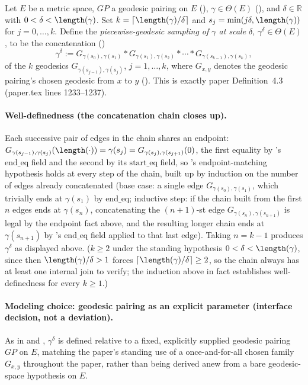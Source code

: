 \begin{definition}
  Let $E$ be a metric space, $GP$ a geodesic pairing on $E$ (),
  $\gamma \in \Theta(E)$ (), and $\delta \in \mathbb{R}$ with
  $0 < \delta < \length(\gamma)$. Set $k = \lceil \length(\gamma)/\delta \rceil$ and
  $s_j = \min(j\delta,\length(\gamma))$ for $j = 0,\dotsc,k$. Define the \emph{piecewise-geodesic
  sampling of $\gamma$ at scale $\delta$}, $\gamma^\delta \in \Theta(E)$, to be the concatenation
  ()
  \[
    \gamma^\delta := G_{\gamma(s_0),\gamma(s_1)} * G_{\gamma(s_1),\gamma(s_2)} * \cdots *
    G_{\gamma(s_{k-1}),\gamma(s_k)}
    ,
  \]
  of the $k$ geodesics $G_{\gamma(s_{j-1}),\gamma(s_j)}$, $j=1,\dotsc,k$, where $G_{x,y}$ denotes
  the geodesic pairing's chosen geodesic from $x$ to $y$ (). This is
  exactly paper Definition~4.3 (paper.tex lines 1233--1237).

  \paragraph{Well-definedness (the concatenation chain closes up).} Each successive pair of edges
  in the chain shares an endpoint: $G_{\gamma(s_{j-1}),\gamma(s_j)}(\length(\cdot)) = \gamma(s_j) =
  G_{\gamma(s_j),\gamma(s_{j+1})}(0)$, the first equality by 's
  $\mathrm{end\_eq}$ field and the second by its $\mathrm{start\_eq}$ field, so
  's endpoint-matching hypothesis holds at every step of the chain, built up
  by induction on the number of edges already concatenated (base case: a single edge
  $G_{\gamma(s_0),\gamma(s_1)}$, which trivially ends at $\gamma(s_1)$ by $\mathrm{end\_eq}$;
  inductive step: if the chain built from the first $n$ edges ends at $\gamma(s_n)$, concatenating
  the $(n{+}1)$-st edge $G_{\gamma(s_n),\gamma(s_{n+1})}$ is legal by the endpoint fact above, and
  the resulting longer chain ends at $\gamma(s_{n+1})$ by 's
  $\mathrm{end\_eq}$ field applied to that last edge). Taking $n = k-1$ produces $\gamma^\delta$ as
  displayed above. ($k \ge 2$ under the standing hypothesis $0 < \delta < \length(\gamma)$, since
  then $\length(\gamma)/\delta > 1$ forces $\lceil \length(\gamma)/\delta \rceil \ge 2$, so the
  chain always has at least one internal join to verify; the induction above in fact establishes
  well-definedness for every $k \ge 1$.)

  \paragraph{Modeling choice: geodesic pairing as an explicit parameter (interface decision, not a
  deviation).} As in  and , $\gamma^\delta$ is defined
  relative to a fixed, explicitly supplied geodesic pairing $GP$ on $E$, matching the paper's
  standing use of a once-and-for-all chosen family $G_{x,y}$ throughout the paper, rather than
  being derived anew from a bare geodesic-space hypothesis on $E$.
\end{definition}
